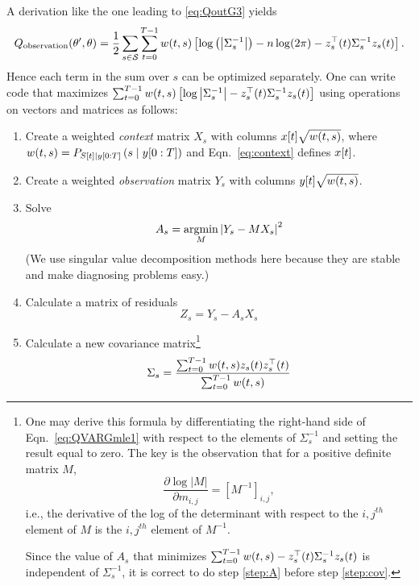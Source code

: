 A derivation like the one leading to \eqref{eq:QoutG3} yields
\begin{equation}
  \label{eq:QVARGmle1}
  Q_{\text{observation}} (\parameters',\parameters) =  \frac{1}{2}
      \sum_{s\in\states} \sum_{t=0}^{T-1} w(t,s) \left[ \log\left( \left|
      \Sigma_s^{-1} \right| \right) - n
      \log(2\pi) - z_s\transpose(t)
      \Sigma_s^{-1} z_s(t)\right].
\end{equation}
Hence each term in the sum over $s$ can be optimized separately.  One
can write code that maximizes $ \sum_{t=0}^{T-1} w(t,s) \left[ \log \left|
    \Sigma_s^{-1} \right| - z_s^\top(t) \Sigma_s^{-1}
  z_s(t)\right]$ using operations on vectors and matrices as
follows:
\begin{enumerate}
\item Create a weighted \emph{context} matrix $X_s$ with columns
  ${x}{[t]}\sqrt{w(t,s)}$, where $w(t,s) =
  P_{{S}{[t]}\mid y[0:T]} \left(s\mid y[0:T] \right)$ and
  Eqn.~\eqref{eq:context} defines ${x}{[t]}$.
\item Create a weighted \emph{observation} matrix $Y_s$ with columns
  ${y}{[t]}\sqrt{w(t,s)}$.
\item \label{step:A} Solve
  \begin{equation}
    \label{eq:VARGnewA}
    A_s = \operatorname*{argmin}_M \left|Y_s - MX_s \right|^2
  \end{equation}
  (We use singular value decomposition methods here because they are
  stable and make diagnosing problems easy.)
\item Calculate a matrix of residuals
  \begin{equation*}
    Z_s = Y_s - A_s X_s
  \end{equation*}
\item \label{step:cov} Calculate a new covariance matrix\footnote{One
    may derive this formula by differentiating the right-hand side of
    Eqn.~\ref{eq:QVARGmle1} with respect to the elements of
    $\Sigma_s^{-1}$ and setting the result equal to zero.  The key is
    the observation that for a positive definite matrix $M$,
  \begin{equation*}
    \frac{\partial \log \left| M \right|}{\partial m_{i,j}} =
    \left[M^{-1}\right]_{i,j},
  \end{equation*}
  i.e., the derivative of the log of the determinant with respect to the
  $i,j^{th}$ element of $M$ is the $i,j^{th}$ element of $M^{-1}$.
  
  Since the value of $A_s$ that minimizes $ \sum_{t=0}^{T-1} w(t,s) -
  z_s^\top(t) \Sigma_s^{-1} z_s(t)$ is independent of
$\Sigma_s^{-1}$, it is correct to do step \ref{step:A} before step
\ref{step:cov}. }
  \begin{equation}
    \label{eq:VARGnewSigma}
    \Sigma_s = \frac{\sum_{t=0}^{T-1} w(t,s) z_s(t)
      z_s^\top(t)}{\sum_{t=0}^{T-1} w(t,s)}
  \end{equation}
\end{enumerate}

